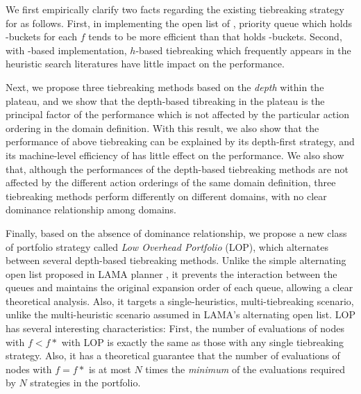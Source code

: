 We first empirically clarify two facts regarding the
existing tiebreaking strategy for \astar as follows.
% 
First, in implementing the open list of \astar, priority queue which holds
\lifo-buckets for each $f$ tends to be more efficient than that holds \fifo-buckets.
% 
Second, with \lifo-based implementation, $h$-based tiebreaking which
frequently appears in the heuristic search literatures have little
impact on the performance.
% 
 
Next, we propose three tiebreaking methods
based on the \emph{depth} within the plateau, and
we show that the depth-based tibreaking in the plateau is
the principal factor of the performance which is
not affected by the particular action ordering in the domain definition.
% 
With this result, we also show that 
the performance of above \lifo tiebreaking can be explained by its
depth-first strategy, and its machine-level efficiency of \lifo
has little effect on the performance.
% 
We also show that,
although the performances of the depth-based tiebreaking
methods are not affected by the
different action orderings of the same domain definition,
three tiebreaking methods perform differently on different domains,
with no clear dominance relationship among domains.

Finally, based on the absence of dominance relationship, we propose a
new class of portfolio strategy called \emph{Low Overhead Portfolio} (LOP),
which alternates between several depth-based tiebreaking methods.
Unlike the simple alternating open list proposed in LAMA planner \cite{richter2010lama},
it prevents the interaction between the queues and maintains the original
expansion order of each queue, allowing a clear theoretical analysis.
Also, it targets a single-heuristics, multi-tiebreaking scenario, unlike
the multi-heuristic scenario assumed in LAMA's alternating open list.
% 
LOP has several interesting characteristics:
First, the number of evaluations of nodes with $f<f*$ with LOP is exactly the same as
those with any single tiebreaking strategy.
Also, it has a theoretical guarantee that
the number of evaluations of nodes with $f=f*$ is at most $N$ times the \emph{minimum} 
of the evaluations required by $N$ strategies in the portfolio.
% 

